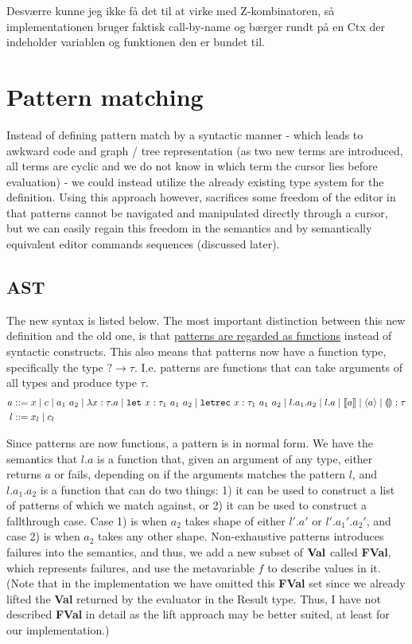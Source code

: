 \documentclass[10pt,a4paper,english]{article}
\newcommand\letin[3]{\texttt{let}~#1~#2~#3}
\newcommand\letrec[3]{\texttt{letrec}~#1~#2~#3}
\begin{document}
{\color{red} Desværre kunne jeg ikke få det til at virke med Z-kombinatoren, så implementationen bruger faktisk call-by-name og bærger rundt på en Ctx der indeholder variablen og funktionen den er bundet til.}



\section{Pattern matching}
Instead of defining pattern match by a syntactic manner - which leads to awkward code and graph / tree representation (as two new terms are introduced, all terms are cyclic and we do not know in which term the cursor lies before evaluation) - we could instead utilize the already existing type system for the definition. Using this approach however, sacrifices some freedom of the editor in that patterns cannot be navigated and manipulated directly through a cursor, but we can easily regain this freedom in the semantics and by semantically equivalent editor commands sequences (discussed later).

\subsection{AST}
The new syntax is listed below. The most important distinction between this new definition and the old one, is that \underline{patterns are regarded as functions} instead of syntactic constructs. This also means that patterns now have a function type, specifically the type $\texttt{?}\to\tau$. I.e. patterns are functions that can take arguments of all types and produce type $\tau$.
\begin{align}
  a &::= x
  \mid c
  \mid \app{a_1}{a_2}
  \mid \abs{\bind{x}{\tau}}{a}
  \mid \letin{\bind{x}{\tau_1}}{a_1}{a_2}
  \mid \letrec{\bind{x}{\tau_1}}{a_1}{a_2}
  \mid l.a_1.a_2
  \mid l.a
  \mid \cursor{a}
  \mid \breakpoint{a}
  \mid \bind{\hole}{\tau}\\
  l &::= x_l
  \mid c_l
\end{align}

Since patterns are now functions, a pattern is in normal form. We have the semantics that $l.a$ is a function that, given an argument of any type, either returns $a$ or fails, depending on if the arguments matches the pattern $l$, and $l.a_1.a_2$ is a function that can do two things: 1) it can be used to construct a list of patterns of which we match against, or 2) it can be used to construct a fallthrough case. Case 1) is when $a_2$ takes shape  of either $l'.a'$ or $l'.a_1'.a_2'$, and case 2) is when $a_2$ takes any other shape. Non-exhaustive patterns introduces failures into the semantics, and thus, we add a new subset of $\textbf{Val}$ called \textbf{FVal}, which represents failures, and use the metavariable $f$ to describe values in it. (Note that in the implementation we have omitted this \textbf{FVal} set since we already lifted the \textbf{Val} returned by the evaluator in the Result type. Thus, I have not described \textbf{FVal} in detail as the lift approach may be better suited, at least for our implementation.)
\end{document}
